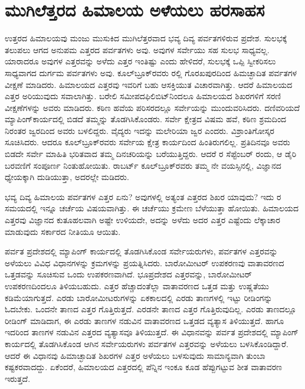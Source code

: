 
\chapter{ಮುಗಿಲೆತ್ತರದ ಹಿಮಾಲಯ ಅಳೆಯಲು ಹರಸಾಹಸ}

\vskip -5pt

ಉತ್ತರದ ಹಿಮಾಲಯವು ಮಂಜು ಮುಸುಕಿದ ಮುಗಿಲೆತ್ತರವಾದ ಭವ್ಯ ದಿವ್ಯ ಪರ್ವತಗಳಿರುವ ಪ್ರದೇಶ. ಸುಲಭಕ್ಕೆ ತಲುಪಲು ಆಗದ ಅನುಪಮ ಎತ್ತರದ ಪರ್ವತಗಳು ಅವು. ಅವುಗಳ ಸರ್ವೇಯು ಸಹ ಸುಲಭ ಸಾಧ್ಯವಲ್ಲ. ಯಾರಾದರೂ ಅವುಗಳ ಎತ್ತರವನ್ನು ಅಳೆದು ಎತ್ತರ ಇಂತಿಷ್ಟು ಎಂದು ಹೇಳಿದರೆ, ಸುಲಭಕ್ಕೆ ಒಪ್ಪಿ ಸ್ವೀಕರಿಸಲು ಸಾಧ್ಯವಾಗದ ದುರ್ಗಮ ಪರ್ವತಗಳು ಅವು. ಕೂಲ್​ಬ್ರೂಕ್​ರವರು ರಲ್ಲಿ ಗೊರಖಪುರದಿಂದ ಹಿಮಚ್ಛಾದಿತ ಪರ್ವತಗಳ ವೀಕ್ಷಣೆ ಮಾಡಿದರು. ಹಿಮಾಲಯದ ಎತ್ತರವು ಇವರಿಗೆ ಬಹು ಆಸಕ್ತಿಯುತ ವಿಚಾರವಾಗಿತ್ತು. ಆದರೆ ಹಿಮಾಲಯದ ಎತ್ತರ ಅರಿಯುವುದು ಸವಾಲಾಗಿತ್ತು. ಬರೇಲಿ ಸಮೀಪದ\break ಫಿಲಿಬಿಟ್​ನಿಂದಲೂ ಹಿಮಾಲಯದ ಶಿಖರಗಳಿಗೆ ಸರಣಿ ವೀಕ್ಷಣೆಗಳನ್ನು ಅವರು ಮಾಡಿದರು. ಕಠಿಣ ಹವೆಯ ಪರಿಸರದಲ್ಲೂ ಸರ್ವೇಯನ್ನು ಮುಂದುವರಿಸಿದರು. ದಣಿವರಿಯದೆ ಮ್ಯಾಪಿಂಗ್​ ಕಾರ್ಯದಲ್ಲಿ ಬಿಡದೆ ತಮ್ಮನ್ನು ತೊಡಗಿಸಿಕೊಂಡರು. ಸರ್ವೇ ಕ್ಷೇತ್ರದ ವಿಷಮ ಹವೆ, ಕಠಿಣ ಶ್ರಮದಿಂದ ನಿರಂತರ ಜ್ವರದಿಂದ ಅವರು ಬಳಲಿದ್ದರು. ವೈದ್ಯರು ಇದನ್ನು ಮಲೇರಿಯಾ ಜ್ವರ ಎಂದರು. ವಿಶ್ರಾಂತಿಗೋಸ್ಕರ ಸೂಚಿಸಿದರು. ಆದರೂ ಕೂಲ್​ಬ್ರೂಕ್​ರವರು ಸರ್ವೇಯ ಕ್ಷೇತ್ರ ಕಾರ್ಯದಿಂದ ಹಿಂತಿರುಗಲಿಲ್ಲ. ಪ್ರತಿದಿನವೂ ಅವರು ಬಿಡದೇ ಸರ್ವೇ ಮಾಹಿತಿ ಭರಿತವಾದ ತಮ್ಮ ದಿನಚರಿಯನ್ನು ಬರೆಯುತ್ತಿದ್ದರು. ಆದರೆ ರ ಸೆಪ್ಟೆಂಬರ್​ ರಂದು, ಆ ಡೈರಿ ಬರವಣಿಗೆ ಸಂಪೂರ್ಣ ನಿಂತುಹೋಯಿತು. ರಾಬರ್ಟ್ ಕೂಲ್​ಬ್ರೂಕ್​ರವರು ತಮ್ಮ ನೇ ವಯಸ್ಸಿನಲ್ಲಿ, ವಿಜ್ಞಾನದ ಧ್ಯೇಯಕ್ಕಾಗಿ ದುಡಿಯುತ್ತಾ, ಅದರಲ್ಲೇ ಮಡಿದರು.

\vskip 2pt

ಭವ್ಯ ದಿವ್ಯ ಹಿಮಾಲಯ ಪರ್ವತಗಳ ಎತ್ತರ ಏನು? ಅವುಗಳಲ್ಲಿ ಅತ್ಯಂತ ಎತ್ತರದ ಶಿಖರ ಯಾವುದು? ಇದು ರ ಸಮಯದಲ್ಲಿ ಇನ್ನೂ ಚರ್ಚೆಯ ವಿಷಯವಾಗಿತ್ತು. ಈ ಚರ್ಚೆಯು ಕ್ರಮೇಣ ಬೆಳೆಯುತ್ತಾ ಹೋಯಿತು. ಹಿಮಾಲಯದ ಎತ್ತರವು ವಿಜ್ಞಾನದ ಕುತೂಹಲವಾಗಿ ಅಷ್ಟೇ ಉಳಿಯದೇ, ಅದನ್ನು ಅಳೆದು ಅದರ ಎತ್ತರ ಎಷ್ಟೆಂದು ಲೆಕ್ಕಾಚಾರ ಮಾಡುವುದು ಸರ್ಕಾರದ ನೀತಿಯೂ ಆಯಿತು.

\vskip 3pt

ಪರ್ವತ ಪ್ರದೇಶದಲ್ಲಿ ಮ್ಯಾಪಿಂಗ್​ ಕಾರ್ಯದಲ್ಲಿ ತೊಡಗಿಸಿಕೊಂಡ ಸರ್ವೇಯರುಗಳು, ಪರ್ವತಗಳ ಎತ್ತರವನ್ನು ಅಳೆಯಲು ವಿವಿಧ ವಿಧಾನಗಳನ್ನು ಕ್ರಮಗಳನ್ನು ಪ್ರಯತ್ನಿಸಿದರು. ಬಾರೋಮೀಟರ್​ ಉಪಕರಣವು ವಾತಾವರಣದ ಒತ್ತಡವನ್ನು ಸೂಚಿಸುವ ಒಂದು ಉಪಕರಣವಾಗಿದೆ. ಭೂಪ್ರದೇಶದ ಎತ್ತರವನ್ನು, ಬಾರೋಮೀಟರ್​ ಉಪಕರಣದಿಂದಲೂ ತಿಳಿಯಬಹುದು. ಎತ್ತರ ಹೆಚ್ಚಾದಂತೆಲ್ಲಾ ವಾತಾವರಣದ ಒತ್ತಡ ಮತ್ತು ಉಷ್ಣತೆಯು ಕಡಿಮೆಯಾಗುತ್ತದೆ. ಎರಡು ಬಾರೋಮೀಟರುಗಳನ್ನು ಏಕಕಾಲದಲ್ಲಿ ಎರಡು ತಾಣಗಳಲ್ಲಿ ಇಟ್ಟು ರೀಡಿಂಗನ್ನು ಓದಬೇಕು. ಒಂದನೇ ತಾಣದ ಎತ್ತರ ಗೊತ್ತಿರುತ್ತದೆ. ಎರಡನೇ ತಾಣದ ಎತ್ತರ ಗೊತ್ತಿರುವುದಿಲ್ಲ. ಎರಡು ತಾಣದಲ್ಲೂ ರೀಡಿಂಗ್​ ಮಾಡಿದಾಗ, ಈ ಎರಡು ತಾಣಗಳ ನಡುವಿನ ವಾತಾವರಣದ ಒತ್ತಡದ ವ್ಯತ್ಯಾಸ ತಿಳಿಯುತ್ತದೆ. ಹಾಗೂ ಇದರಿಂದ ತಾಣಗಳ ನಡುವಿನ ಎತ್ತರದ ವ್ಯತ್ಯಾಸವೂ ತಿಳಿಯುತ್ತದೆ. ಈ ವಿಧಾನವನ್ನು ಪರ್ವತ ಪ್ರದೇಶದಲ್ಲಿ ಮ್ಯಾಪಿಂಗ್​ ಕಾರ್ಯದಲ್ಲಿ ತೊಡಗಿಸಿಕೊಂಡ ಆಗಿನ ಸರ್ವೇಯರುಗಳು ಪರ್ವತಗಳ ಎತ್ತರವನ್ನು ಅಳೆಯಲು ಬಳಸಿಕೊಂಡಿದ್ದಾರೆ. ಆದರೆ ಈ ವಿಧಾನವು ಹಿಮಾಚ್ಛಾದಿತ ಶಿಖರಗಳ ಎತ್ತರ ಅಳೆಯಲು ಬಳಸುವುದು ಸಾಮಾನ್ಯವಾಗಿ ತುಂಬಾ ಕಷ್ಟಕರವಾದದ್ದು. ಏಕೆಂದರೆ, ಹಿಮಾಲಯದ ಎತ್ತರದಲ್ಲಿ ಪೆನ್ನಿನ ಇಂಕೂ ಕೂಡ ಹೆಪ್ಪುಗಟ್ಟುವ ಶೀತ ವಾತಾವರಣ ಇರುತ್ತದೆ.


